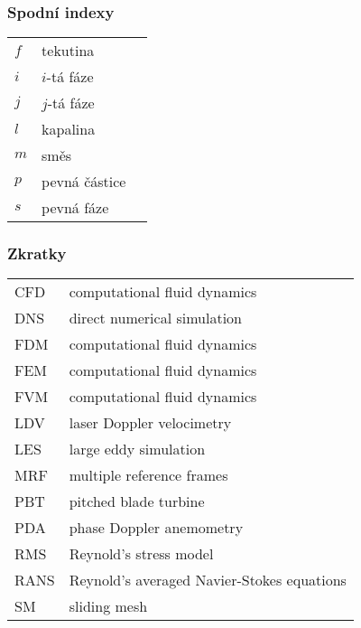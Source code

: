 \subsubsection*{Spodní indexy}
\begin{tabularx}{\textwidth}{@{}p{1.0cm} X r@{}}

$f$ & tekutina & \\
$i$ & $i$-tá fáze & \\
$j$ & $j$-tá fáze & \\
$l$ & kapalina & \\
$m$ & směs & \\
$p$ & pevná částice & \\
$s$ & pevná fáze & \\
\end{tabularx}

\subsubsection*{Zkratky}
\begin{tabularx}{\textwidth}{@{}p{1.0cm} X }
	
CFD & computational fluid dynamics  \\
DNS & direct numerical simulation \\
FDM & computational fluid dynamics  \\
FEM & computational fluid dynamics  \\
FVM & computational fluid dynamics  \\
LDV & laser Doppler velocimetry  \\
LES & large eddy simulation \\
MRF & multiple reference frames \\
PBT & pitched blade turbine \\
PDA & phase Doppler anemometry \\
RMS & Reynold's stress model\\
RANS & Reynold's averaged Navier-Stokes equations \\
SM & sliding mesh
\end{tabularx}
